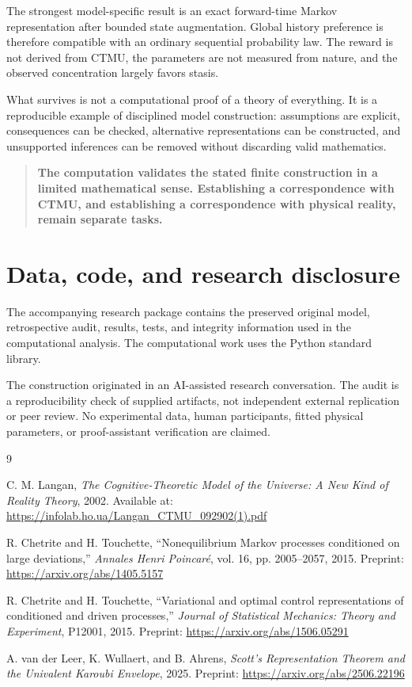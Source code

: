 \documentclass[11pt]{article}
\theoremstyle{remark}
\begin{document}
The strongest model-specific result is an exact forward-time Markov representation after bounded state augmentation. Global history preference is therefore compatible with an ordinary sequential probability law. The reward is not derived from CTMU, the parameters are not measured from nature, and the observed concentration largely favors stasis.

What survives is not a computational proof of a theory of everything. It is a reproducible example of disciplined model construction: assumptions are explicit, consequences can be checked, alternative representations can be constructed, and unsupported inferences can be removed without discarding valid mathematics.

\begin{quote}
\textbf{The computation validates the stated finite construction in a limited mathematical sense. Establishing a correspondence with CTMU, and establishing a correspondence with physical reality, remain separate tasks.}
\end{quote}

\section*{Data, code, and research disclosure}

The accompanying research package contains the preserved original model, retrospective audit, results, tests, and integrity information used in the computational analysis. The computational work uses the Python standard library.

The construction originated in an AI-assisted research conversation. The audit is a reproducibility check of supplied artifacts, not independent external replication or peer review. No experimental data, human participants, fitted physical parameters, or proof-assistant verification are claimed.

\begin{thebibliography}{9}

C. M. Langan,
\emph{The Cognitive-Theoretic Model of the Universe: A New Kind of Reality Theory},
2002.
Available at: \url{https://infolab.ho.ua/Langan_CTMU_092902(1).pdf}

R. Chetrite and H. Touchette,
``Nonequilibrium Markov processes conditioned on large deviations,''
\emph{Annales Henri Poincar\'e}, vol. 16, pp. 2005--2057, 2015.
Preprint: \url{https://arxiv.org/abs/1405.5157}

R. Chetrite and H. Touchette,
``Variational and optimal control representations of conditioned and driven processes,''
\emph{Journal of Statistical Mechanics: Theory and Experiment}, P12001, 2015.
Preprint: \url{https://arxiv.org/abs/1506.05291}

A. van der Leer, K. Wullaert, and B. Ahrens,
\emph{Scott's Representation Theorem and the Univalent Karoubi Envelope},
2025.
Preprint: \url{https://arxiv.org/abs/2506.22196}

\end{thebibliography}
\end{document}
